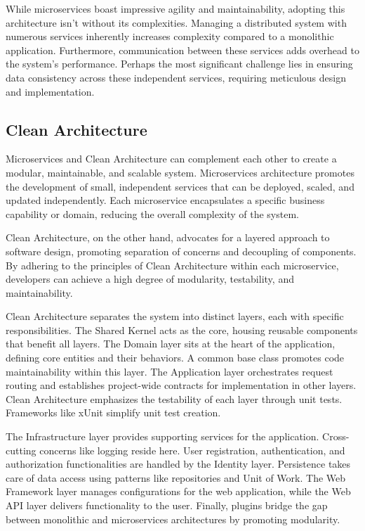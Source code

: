 While microservices boast impressive agility and maintainability, adopting this
architecture isn't without its complexities.  Managing a distributed system with
numerous services inherently increases complexity compared to a monolithic
application.  Furthermore, communication between these services adds overhead to
the system's performance.  Perhaps the most significant challenge lies in
ensuring data consistency across these independent services, requiring
meticulous design and implementation.

\subsection{Clean Architecture}

Microservices and Clean Architecture can complement each other to create a
modular, maintainable, and scalable system. Microservices architecture promotes
the development of small, independent services that can be deployed, scaled, and
updated independently. Each microservice encapsulates a specific business
capability or domain, reducing the overall complexity of the system.

Clean Architecture, on the other hand, advocates for a layered approach to
software design, promoting separation of concerns and decoupling of components.
By adhering to the principles of Clean Architecture within each microservice,
developers can achieve a high degree of modularity, testability, and
maintainability.

Clean Architecture separates the system into distinct layers, each with specific
responsibilities. The Shared Kernel acts as the core, housing reusable
components that benefit all layers. The Domain layer sits at the heart of the
application, defining core entities and their behaviors. A common base class
promotes code maintainability within this layer. The Application layer
orchestrates request routing and establishes project-wide contracts for
implementation in other layers. Clean Architecture emphasizes the testability of
each layer through unit tests. Frameworks like xUnit simplify unit test
creation. 

The Infrastructure layer provides supporting services for the application.
Cross-cutting concerns like logging reside here. User registration,
authentication, and authorization functionalities are handled by the Identity
layer. Persistence takes care of data access using patterns like repositories
and Unit of Work. The Web Framework layer manages configurations for the web
application, while the Web API layer delivers functionality to the user.
Finally, plugins bridge the gap between monolithic and microservices
architectures by promoting modularity.

